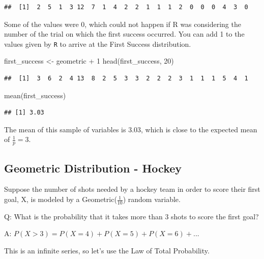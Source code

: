 \documentclass[
]{book}
\newenvironment{Shaded}{\begin{snugshade}}{\end{snugshade}}
\newcommand{\DecValTok}[1]{\textcolor[rgb]{0.00,0.00,0.81}{#1}}
\newcommand{\FunctionTok}[1]{\textcolor[rgb]{0.00,0.00,0.00}{#1}}
\newcommand{\NormalTok}[1]{#1}
\newcommand{\OtherTok}[1]{\textcolor[rgb]{0.56,0.35,0.01}{#1}}
\newcommand{\SpecialCharTok}[1]{\textcolor[rgb]{0.00,0.00,0.00}{#1}}
\theoremstyle{definition}
\theoremstyle{definition}
\theoremstyle{definition}
\theoremstyle{definition}
\theoremstyle{remark}
\begin{document}
\begin{verbatim}
##  [1]  2  5  1  3 12  7  1  4  2  2  1  1  1  2  0  0  0  4  3  0
\end{verbatim}

Some of the values were 0, which could not happen if R was considering the number of the trial on which the first success occurred. You can add 1 to the values given by \texttt{R} to arrive at the First Success distribution.

\begin{Shaded}
\begin{Highlighting}[]
\NormalTok{first\_success }\OtherTok{\textless{}{-}}\NormalTok{ geometric }\SpecialCharTok{+} \DecValTok{1}
\FunctionTok{head}\NormalTok{(first\_success, }\DecValTok{20}\NormalTok{)}
\end{Highlighting}
\end{Shaded}

\begin{verbatim}
##  [1]  3  6  2  4 13  8  2  5  3  3  2  2  2  3  1  1  1  5  4  1
\end{verbatim}

\begin{Shaded}
\begin{Highlighting}[]
\FunctionTok{mean}\NormalTok{(first\_success)}
\end{Highlighting}
\end{Shaded}

\begin{verbatim}
## [1] 3.03
\end{verbatim}

The mean of this sample of variables is 3.03, which is close to the expected mean of \(\frac{1}{p} = 3\).

\hypertarget{geometric-distribution---hockey-1}{%
\subsection{Geometric Distribution - Hockey}\label{geometric-distribution---hockey-1}}

Suppose the number of shots needed by a hockey team in order to score their first goal, X, is modeled by a Geometric(\(\frac{1}{10}\)) random variable.

Q: What is the probability that it takes more than 3 shots to score the first goal?

A: \(P(X > 3) = P(X = 4) + P(X = 5) + P(X = 6) + ...\)

This is an infinite series, so let's use the Law of Total Probability.
\end{document}
